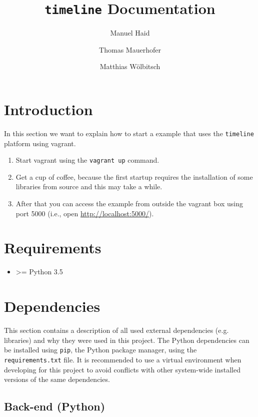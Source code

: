 \documentclass[11pt, a4paper]{article}
\author{Manuel Haid \and Thomas Mauerhofer \and Matthias Wölbitsch}
\title{\texttt{timeline} Documentation}
\begin{document}
\maketitle
\tableofcontents

\section{Introduction} \label{sec:intoduction}

In this section we want to explain how to start a example that uses the \texttt{timeline} platform using vagrant.

\begin{enumerate}
\item Start vagrant using the \texttt{vagrant up} command.
\item Get a cup of coffee, because the first startup requires the installation of some libraries from source and this may take a while.
\item After that you can access the example from outside the vagrant box using port 5000 (i.e., open \url{http://localhost:5000/}).
\end{enumerate}

\section{Requirements} \label{sec:requirments}

\begin{itemize}
 \item \textgreater= Python 3.5
\end{itemize}
 

\section{Dependencies}\label{sec:dependencies}

This section contains a description of all used external dependencies (e.g. libraries) and why they were used in this project.
The Python dependencies can be installed using \texttt{pip}, the Python package manager, using the \texttt{requirements.txt} file. 
It is recommended to use a virtual environment when developing for this project to avoid conflicts with other system-wide installed versions of the same dependencies.


\subsection{Back-end (Python)}
\end{document}
